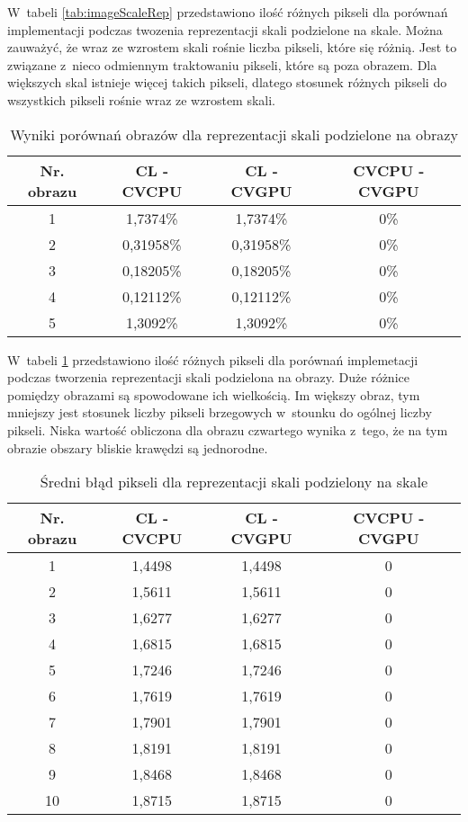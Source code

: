 W~tabeli \ref{tab:imageScaleRep} przedstawiono ilość różnych pikseli dla porównań implementacji podczas twozenia reprezentacji skali podzielone na skale. Można zauważyć, że wraz ze wzrostem skali rośnie liczba pikseli, które się różnią. Jest to związane z~nieco odmiennym traktowaniu pikseli, które są poza obrazem. Dla większych skal istnieje więcej takich pikseli, dlatego stosunek różnych pikseli do wszystkich pikseli rośnie wraz ze wzrostem skali.

\begin{center}
\begin{table}
\centering
\caption{Wyniki porównań obrazów dla reprezentacji skali podzielone na obrazy}
\label{tab:imageImageRep}
\begin{tabular}{|c|c|c|c|}
\hline
Nr. obrazu & CL - CVCPU & CL - CVGPU & CVCPU - CVGPU \\ \hline
1 & 1,7374\% & 1,7374\% & 0\% \\ \hline
2 & 0,31958\% & 0,31958\% & 0\% \\ \hline
3 & 0,18205\% & 0,18205\% & 0\% \\ \hline
4 & 0,12112\% & 0,12112\% & 0\% \\ \hline
5 & 1,3092\% & 1,3092\% & 0\% \\ \hline
\end{tabular}
\end{table}
\end{center}

W~tabeli \ref{tab:imageImageRep} przedstawiono ilość różnych pikseli dla porównań implemetacji podczas tworzenia reprezentacji skali podzielona na obrazy. Duże różnice pomiędzy obrazami są spowodowane ich wielkością. Im większy obraz, tym mniejszy jest stosunek liczby pikseli brzegowych w~stounku do ogólnej liczby pikseli. Niska wartość obliczona dla obrazu czwartego wynika z~tego, że na tym obrazie obszary bliskie krawędzi są jednorodne.

\begin{center}
\begin{table}
\centering
\caption{Średni błąd pikseli dla reprezentacji skali podzielony na skale}
\label{tab:devScaleRep}
\begin{tabular}{|c|c|c|c|}
\hline
Nr. obrazu & CL - CVCPU & CL - CVGPU & CVCPU - CVGPU \\ \hline
1 & 1,4498 & 1,4498 & 0 \\ \hline
2 & 1,5611 & 1,5611 & 0 \\ \hline
3 & 1,6277 & 1,6277 & 0 \\ \hline
4 & 1,6815 & 1,6815 & 0 \\ \hline
5 & 1,7246 & 1,7246 & 0 \\ \hline
6 & 1,7619 & 1,7619 & 0 \\ \hline
7 & 1,7901 & 1,7901 & 0 \\ \hline
8 & 1,8191 & 1,8191 & 0 \\ \hline
9 & 1,8468 & 1,8468 & 0 \\ \hline
10 & 1,8715 & 1,8715 & 0 \\ \hline
\end{tabular}
\end{table}
\end{center}

